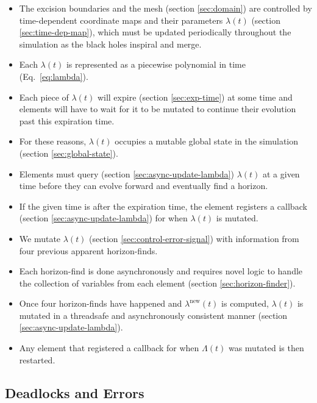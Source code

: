 \begin{bibunit}[unsrtnat]
\begin{itemize}
  \item The excision boundaries and the mesh (section \ref{sec:domain}) are
  controlled by time-dependent coordinate maps and their parameters $\lambda(t)$
  (section \ref{sec:time-dep-map}), which must be updated periodically
  throughout the simulation as the black holes inspiral and merge.
  \item Each $\lambda(t)$ is represented as a piecewise polynomial
  in time (Eq.~\eqref{eq:lambda}).
  \item Each piece of $\lambda(t)$ will expire (section \ref{sec:exp-time}) at
  some time and elements will have to wait for it to be mutated to continue
  their evolution past this expiration time.
  \item For these reasons, $\lambda(t)$ occupies a mutable global state in the
  simulation (section \ref{sec:global-state}).
  \item Elements must query (section \ref{sec:async-update-lambda}) $\lambda(t)$
  at a given time before they can evolve forward and eventually find a horizon.
  \item If the given time is after the expiration time, the element registers a
  callback (section \ref{sec:async-update-lambda}) for when $\lambda(t)$ is
  mutated.
  \item We mutate $\lambda(t)$ (section \ref{sec:control-error-signal}) with
  information from four previous apparent horizon-finds.
  \item Each horizon-find is done asynchronously and requires novel logic to
  handle the collection of variables from each element (section
  \ref{sec:horizon-finder}).
  \item Once four horizon-finds have happened and $\lambda^\mathrm{new}(t)$ is
  computed, $\lambda(t)$ is mutated in a threadsafe and asynchronously
  consistent manner (section \ref{sec:async-update-lambda}).
  \item Any element that registered a callback for when $\Lambda(t)$ was mutated
  is then restarted.
\end{itemize}

\subsection{Deadlocks and Errors\label{sec:deadlock}}


\end{bibunit}
